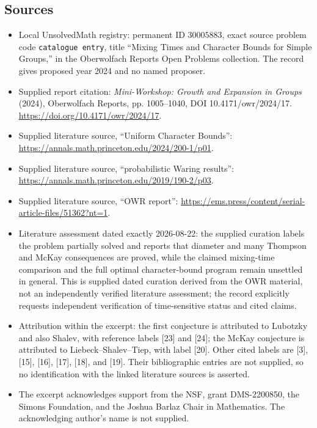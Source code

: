\documentclass[11pt]{article}
\begin{document}
\subsection{Sources}
\begin{itemize}
\item Local UnsolvedMath registry: permanent ID \(30005883\), exact source problem code \texttt{catalogue entry}, title ``Mixing Times and Character Bounds for Simple Groups,'' in the Oberwolfach Reports Open Problems collection. The record gives proposed year 2024 and no named proposer.
\item Supplied report citation: \emph{Mini-Workshop: Growth and Expansion in Groups} (2024), Oberwolfach Reports, pp. 1005--1040, DOI 10.4171/owr/2024/17. \url{https://doi.org/10.4171/owr/2024/17}.
\item Supplied literature source, ``Uniform Character Bounds'': \url{https://annals.math.princeton.edu/2024/200-1/p01}.
\item Supplied literature source, ``probabilistic Waring results'': \url{https://annals.math.princeton.edu/2019/190-2/p03}.
\item Supplied literature source, ``OWR report'': \url{https://ems.press/content/serial-article-files/51362?nt=1}.
\item Literature assessment dated exactly 2026-08-22: the supplied curation labels the problem partially solved and reports that diameter and many Thompson and McKay consequences are proved, while the claimed mixing-time comparison and the full optimal character-bound program remain unsettled in general. This is supplied dated curation derived from the OWR material, not an independently verified literature assessment; the record explicitly requests independent verification of time-sensitive status and cited claims.
\item Attribution within the excerpt: the first conjecture is attributed to Lubotzky and also Shalev, with reference labels [23] and [24]; the McKay conjecture is attributed to Liebeck--Shalev--Tiep, with label [20]. Other cited labels are [3], [15], [16], [17], [18], and [19]. Their bibliographic entries are not supplied, so no identification with the linked literature sources is asserted.
\item The excerpt acknowledges support from the NSF, grant DMS-2200850, the Simons Foundation, and the Joshua Barlaz Chair in Mathematics. The acknowledging author's name is not supplied.
\end{itemize}
\end{document}
